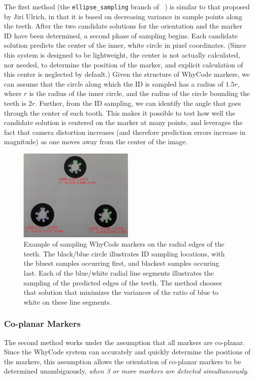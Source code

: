 The first method (the \texttt{ellipse\_sampling} branch of ~\cite{uzgit_whycon}) is similar to that proposed by Jiri Ulrich,
in that it is based on decreasing variance in sample points along the teeth.
After the two candidate solutions for the orientation and the marker ID have been determined,
a second phase of sampling begins.
Each candidate solution predicts the center of the inner, white circle in pixel coordinates.
(Since this system is designed to be lightweight, the center is not actually calculated, nor needed, to determine the position of the marker,
and explicit calculation of this center is neglected by default.)
Given the structure of WhyCode markers, we can assume that the circle along which the ID is sampled
has a radius of $1.5r$, where $r$ is the radius of the inner circle, and the radius of the circle bounding the teeth is $2r$.
Further, from the ID sampling, we can identify the angle that goes through the center of each tooth.
This makes it possible to test how well the candidate solution is centered on the marker at many points,
and leverages the fact that camera distortion increases (and therefore prediction errors increase in magnitude) as one moves away from the center of the image.

\begin{figure}
    \centering
    \includegraphics[width=0.5\textwidth]{images/cropped_whycode_3_8_ellipse_sampling_example}
    \caption{Example of sampling WhyCode markers on the radial edges of the teeth.
    The black/blue circle illustrates ID sampling locations, with the bluest samples occurring first, and blackest samples occuring last.
    Each of the blue/white radial line segments illustrates the sampling of the predicted edges of the teeth.
    The method chooses that solution that minimizes the variances of the ratio of blue to white on these line segments.
    }
    \label{figure:ellipse_sampling}
\end{figure}

\subsubsection{Co-planar Markers}

The second method works under the assumption that all markers are co-planar.
Since the WhyCode system can accurately and quickly determine the positions of the markers,
this assumption allows the orientation of co-planar markers to be determined unambiguously,
\textit{when 3 or more markers are detected simultaneously}.